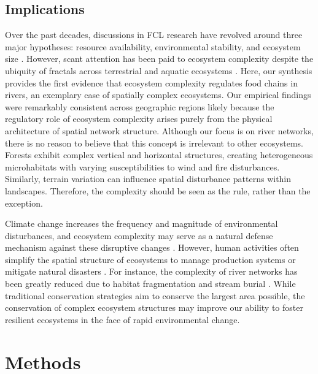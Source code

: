 \documentclass[11pt, class=article, crop=false]{standalone}
\begin{document}
\subsection{Implications}
Over the past decades, discussions in FCL research have revolved around three major hypotheses: resource availability, environmental stability, and ecosystem size \citep{oksanen_exploitation_1981, pimm_number_1977, schoener_food_1989}.
However, scant attention has been paid to ecosystem complexity despite the ubiquity of fractals across terrestrial \citep{turner_landscape_2015} and aquatic ecosystems \citep{rodriguez-iturbe_fractal_2001}.
Here, our synthesis provides the first evidence that ecosystem complexity regulates food chains in rivers, an exemplary case of spatially complex ecosystems.
Our empirical findings were remarkably consistent across geographic regions likely because the regulatory role of ecosystem complexity arises purely from the physical architecture of spatial network structure.
Although our focus is on river networks, there is no reason to believe that this concept is irrelevant to other ecosystems.
Forests exhibit complex vertical and horizontal structures, creating heterogeneous microhabitats with varying susceptibilities to wind and fire disturbances.
Similarly, terrain variation can influence spatial disturbance patterns within landscapes.
Therefore, the complexity should be seen as the rule, rather than the exception.

Climate change increases the frequency and magnitude of environmental disturbances, and ecosystem complexity may serve as a natural defense mechanism against these disruptive changes \citep{terui_metapopulation_2018, terui_emergent_2021, pomeranz_ecosystem_2023}.
However, human activities often simplify the spatial structure of ecosystems to manage production systems or mitigate natural disasters \citep{turner_landscape_2015}.
For instance, the complexity of river networks has been greatly reduced due to habitat fragmentation \citep{grill_mapping_2019} and stream burial \citep{elmore_disappearing_2008}.
While traditional conservation strategies aim to conserve the largest area possible, the conservation of complex ecosystem structures may improve our ability to foster resilient ecosystems in the face of rapid environmental change.

\section{Methods}
\end{document}

